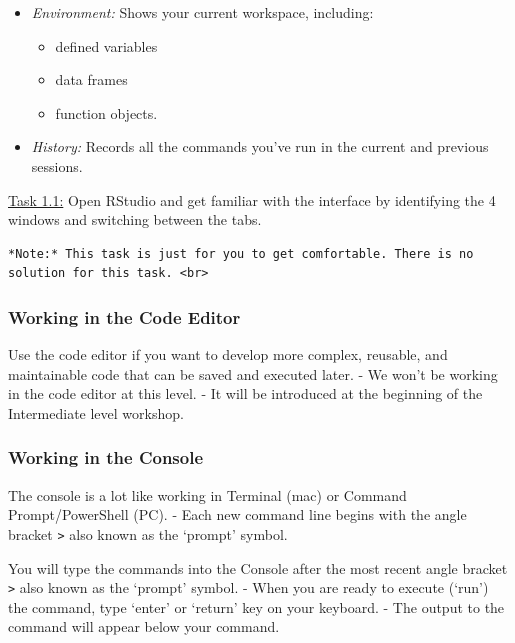 \documentclass[
]{article}
\providecommand{\tightlist}{%
  \setlength{\itemsep}{0pt}\setlength{\parskip}{0pt}}
\begin{document}
\begin{itemize}
\tightlist
\item
  \emph{Environment:} Shows your current workspace, including:

  \begin{itemize}
  \tightlist
  \item
    defined variables
  \item
    data frames
  \item
    function objects.
  \end{itemize}
\item
  \emph{History:} Records all the commands you've run in the current and
  previous sessions.
\end{itemize}

\ul{Task 1.1:} Open RStudio and get familiar with the interface by
identifying the 4 windows and switching between the tabs.

\begin{verbatim}
*Note:* This task is just for you to get comfortable. There is no solution for this task. <br>
\end{verbatim}

\hypertarget{working-in-the-code-editor}{%
\subsubsection{Working in the Code
Editor}\label{working-in-the-code-editor}}

Use the code editor if you want to develop more complex, reusable, and
maintainable code that can be saved and executed later. - We won't be
working in the code editor at this level. - It will be introduced at the
beginning of the Intermediate level workshop.

\hypertarget{working-in-the-console}{%
\subsubsection{Working in the Console}\label{working-in-the-console}}

The console is a lot like working in Terminal (mac) or Command
Prompt/PowerShell (PC). - Each new command line begins with the angle
bracket \texttt{\textgreater{}} also known as the `prompt' symbol.

You will type the commands into the Console after the most recent angle
bracket \texttt{\textgreater{}} also known as the `prompt' symbol. -
When you are ready to execute (`run') the command, type `enter' or
`return' key on your keyboard. - The output to the command will appear
below your command.
\end{document}
